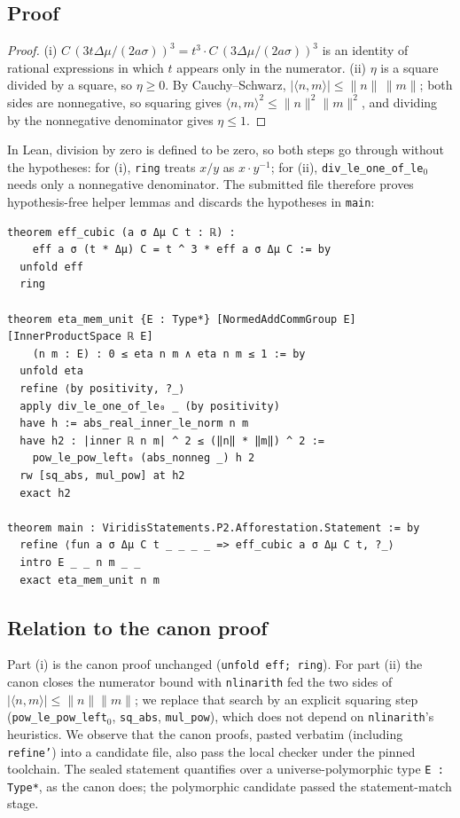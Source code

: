 \documentclass[11pt]{article}
\theoremstyle{definition}
\theoremstyle{remark}
\begin{document}
\subsection{Proof}
\begin{proof}
(i) $C\,(3t\Delta\mu/(2a\sigma))^3=t^3\cdot C\,(3\Delta\mu/(2a\sigma))^3$ is an identity of rational expressions in which
$t$ appears only in the numerator.
(ii) $\eta$ is a square divided by a square, so $\eta\ge0$. By Cauchy--Schwarz, $|\langle n,m\rangle|\le\|n\|\,\|m\|$;
both sides are nonnegative, so squaring gives $\langle n,m\rangle^2\le\|n\|^2\|m\|^2$, and dividing by the nonnegative
denominator gives $\eta\le1$.
\end{proof}
In Lean, division by zero is defined to be zero, so both steps go through without the hypotheses: for (i), \texttt{ring}
treats $x/y$ as $x\cdot y^{-1}$; for (ii), \texttt{div\_le\_one\_of\_le\(_0\)} needs only a nonnegative denominator.
The submitted file therefore proves hypothesis-free helper lemmas and discards the hypotheses in \texttt{main}:
\begin{lstlisting}
theorem eff_cubic (a σ Δμ C t : ℝ) :
    eff a σ (t * Δμ) C = t ^ 3 * eff a σ Δμ C := by
  unfold eff
  ring

theorem eta_mem_unit {E : Type*} [NormedAddCommGroup E] [InnerProductSpace ℝ E]
    (n m : E) : 0 ≤ eta n m ∧ eta n m ≤ 1 := by
  unfold eta
  refine ⟨by positivity, ?_⟩
  apply div_le_one_of_le₀ _ (by positivity)
  have h := abs_real_inner_le_norm n m
  have h2 : |inner ℝ n m| ^ 2 ≤ (‖n‖ * ‖m‖) ^ 2 :=
    pow_le_pow_left₀ (abs_nonneg _) h 2
  rw [sq_abs, mul_pow] at h2
  exact h2

theorem main : ViridisStatements.P2.Afforestation.Statement := by
  refine ⟨fun a σ Δμ C t _ _ _ _ => eff_cubic a σ Δμ C t, ?_⟩
  intro E _ _ n m _ _
  exact eta_mem_unit n m
\end{lstlisting}

\subsection{Relation to the canon proof}
Part (i) is the canon proof unchanged (\texttt{unfold eff; ring}).
For part (ii) the canon closes the numerator bound with \texttt{nlinarith} fed the two sides of
$|\langle n,m\rangle|\le\|n\|\|m\|$; we replace that search by an explicit squaring step
(\texttt{pow\_le\_pow\_left\(_0\)}, \texttt{sq\_abs}, \texttt{mul\_pow}), which does not depend on \texttt{nlinarith}'s heuristics.
We observe that the canon proofs, pasted verbatim (including \texttt{refine'}) into a candidate file, also pass the
local checker under the pinned toolchain.
The sealed statement quantifies over a universe-polymorphic type \texttt{E : Type*}, as the canon does; the polymorphic
candidate passed the statement-match stage.
\end{document}

